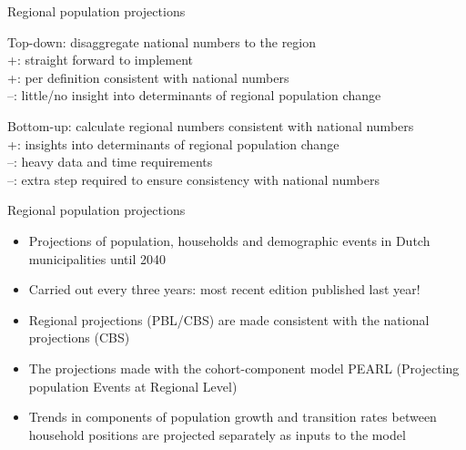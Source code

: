\documentclass[final, 12pt, aspectratio=169, xcolor={dvipsnames}]{beamer}
\begin{document}
\begin{frame}{Regional population projections}
  \begin{minipage}[t]{0.48\linewidth}%
    Top-down: disaggregate national numbers to the region \\
    +: straight forward to implement \\
    +: per definition consistent with national numbers \\
    --: little/no insight into determinants of regional population change
 
\end{minipage}%
\hfill%
\begin{minipage}[t]{0.48\linewidth}
  Bottom-up: calculate regional numbers consistent with national numbers \\

  +: insights into determinants of regional population change \\
  --: heavy data and time requirements \\
  --: extra step required to ensure consistency with national numbers \\
\end{minipage}    
\end{frame}

\begin{frame}{Regional population projections}
  \begin{itemize}
  \item  Projections of population, households and demographic events in Dutch municipalities until 2040
  \item Carried out every three years: most recent edition published last year!
  \item Regional projections (PBL/CBS) are made consistent with the national projections (CBS)
  \item The projections made with the cohort-component model PEARL (Projecting population Events at Regional Level)
    \item Trends in components of population growth and transition rates between household positions are projected separately as inputs to the model
    \end{itemize}
\end{frame}
\end{document}
